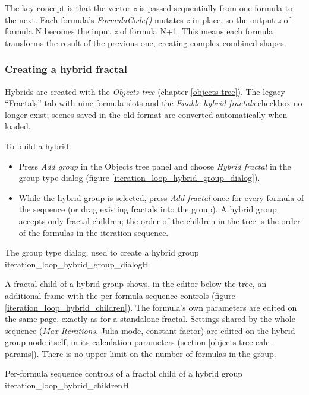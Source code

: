 The key concept is that the vector \emph{z} is passed sequentially from one formula to the next. Each formula's \emph{FormulaCode()} mutates \emph{z} in-place, so the output \emph{z} of formula N becomes the input \emph{z} of formula N+1. This means each formula transforms the result of the previous one, creating complex combined shapes.

\subsubsection{Creating a hybrid fractal}\label{hybrid-fractals-creating}

Hybrids are created with the \emph{Objects tree} (chapter \ref{objects-tree}). The legacy
``Fractals'' tab with nine formula slots and the \emph{Enable hybrid fractals} checkbox no
longer exist; scenes saved in the old format are converted automatically when loaded.

To build a hybrid:
\begin{itemize}
	\item Press \emph{Add group} in the Objects tree panel and choose \emph{Hybrid fractal}
	in the group type dialog (figure \ref{iteration_loop_hybrid_group_dialog}).
	\item While the hybrid group is selected, press \emph{Add fractal} once for every formula
	of the sequence (or drag existing fractals into the group). A hybrid group accepts only
	fractal children; the order of the children in the tree is the order of the formulas in
	the iteration sequence.
\end{itemize}

{The group type dialog, used to create a hybrid group}
{iteration_loop_hybrid_group_dialog}{H}

A fractal child of a hybrid group shows, in the editor below the tree, an additional frame
with the per-formula sequence controls (figure \ref{iteration_loop_hybrid_children}). The
formula's own parameters are edited on the same page, exactly as for a standalone fractal.
Settings shared by the whole sequence (\emph{Max Iterations}, Julia mode, constant factor)
are edited on the hybrid group node itself, in its calculation parameters (section
\ref{objects-tree-calc-params}). There is no upper limit on the number of formulas in the
group.

{Per-formula sequence controls of a fractal child of a hybrid group}
{iteration_loop_hybrid_children}{H}

